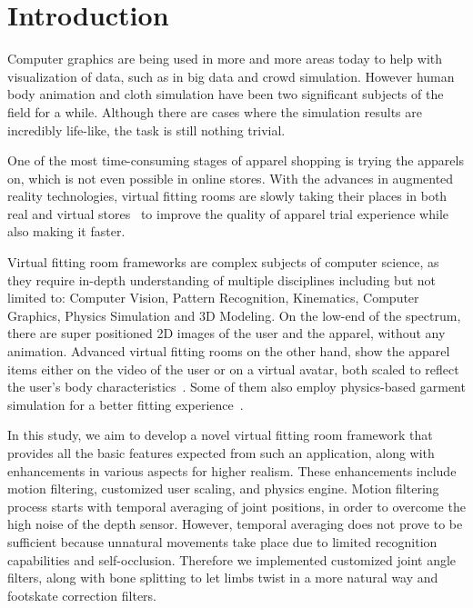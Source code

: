 \chapter{Introduction}
\label{chapter_introduction}

Computer graphics are being used in more and more areas today to help with visualization of data, such as in big data and crowd simulation.
However human body animation and cloth simulation have been two significant subjects of the field for a while. 
Although there are cases where the simulation results are incredibly life-like, the task is still nothing trivial. 

One of the most time-consuming stages of apparel shopping is trying the apparels on, which is not even possible in online stores. 
With the advances in augmented reality technologies, virtual fitting rooms are slowly taking their places in both real and virtual 
stores~\cite{Fitnect2012,Styku2013} to improve the quality of apparel trial experience while also making it faster.

Virtual fitting room frameworks are complex subjects of computer science, as they require in-depth understanding of multiple disciplines 
including but not limited to: Computer Vision, Pattern Recognition, Kinematics, Computer Graphics, Physics Simulation and 3D Modeling. 
On the low-end of the spectrum, there are super positioned 2D images of the user and the apparel, without any animation.
Advanced virtual fitting rooms on the other hand, show the apparel items either on the video 
of the user or on a virtual avatar, both scaled to reflect the user's body 
characteristics~\cite{FaceCake2013}. Some of them also employ physics-based 
garment simulation for a better fitting experience~\cite{Styku2013}.

In this study, we aim to develop a novel virtual fitting room framework that provides all the basic 
features expected from such an application, along with enhancements in various 
aspects for higher realism. These enhancements include motion filtering, 
customized user scaling, and physics engine. Motion filtering process 
starts with temporal averaging of joint positions,
in order to overcome the high noise of the depth sensor. However, temporal
averaging does not prove to be sufficient because unnatural movements take
place due to limited recognition capabilities and self-occlusion.
Therefore we implemented customized joint angle filters, along with bone
splitting to let limbs twist in a more natural way and footskate correction filters.


